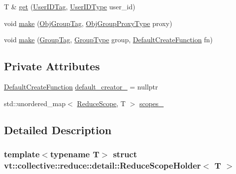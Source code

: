 \begin{DoxyCompactItemize}
\item 
T \& \hyperlink{structvt_1_1collective_1_1reduce_1_1detail_1_1_reduce_scope_holder_a2413b5fd1fbd0b87b09d81240000e5f8}{get} (\hyperlink{structvt_1_1collective_1_1reduce_1_1detail_1_1_reduce_scope_holder_1_1_user_i_d_tag}{User\+I\+D\+Tag}, \hyperlink{namespacevt_1_1collective_1_1reduce_1_1detail_ae82d7b96b0885b9b7dfb0104398beead}{User\+I\+D\+Type} user\+\_\+id)
\item 
void \hyperlink{structvt_1_1collective_1_1reduce_1_1detail_1_1_reduce_scope_holder_a0226c973a9bc67754fe5ce3076cb077e}{make} (\hyperlink{structvt_1_1collective_1_1reduce_1_1detail_1_1_reduce_scope_holder_1_1_obj_group_tag}{Obj\+Group\+Tag}, \hyperlink{namespacevt_ad7cae989df485fccca57f0792a880a8e}{Obj\+Group\+Proxy\+Type} proxy)
\item 
void \hyperlink{structvt_1_1collective_1_1reduce_1_1detail_1_1_reduce_scope_holder_a47ef025fc658370a2d42680f7c006abb}{make} (\hyperlink{structvt_1_1collective_1_1reduce_1_1detail_1_1_reduce_scope_holder_1_1_group_tag}{Group\+Tag}, \hyperlink{namespacevt_a27b5e4411c9b6140c49100e050e2f743}{Group\+Type} group, \hyperlink{structvt_1_1collective_1_1reduce_1_1detail_1_1_reduce_scope_holder_ac1bca1874a023b11bdc3c26b165c3b20}{Default\+Create\+Function} fn)
\end{DoxyCompactItemize}
\subsection*{Private Attributes}
\begin{DoxyCompactItemize}
\item 
\hyperlink{structvt_1_1collective_1_1reduce_1_1detail_1_1_reduce_scope_holder_ac1bca1874a023b11bdc3c26b165c3b20}{Default\+Create\+Function} \hyperlink{structvt_1_1collective_1_1reduce_1_1detail_1_1_reduce_scope_holder_abd3a6a6a1eda5083b97348c16ef58858}{default\+\_\+creator\+\_\+} = nullptr
\item 
std\+::unordered\+\_\+map$<$ \hyperlink{structvt_1_1collective_1_1reduce_1_1detail_1_1_reduce_scope}{Reduce\+Scope}, T $>$ \hyperlink{structvt_1_1collective_1_1reduce_1_1detail_1_1_reduce_scope_holder_a71e4ba9dc78528dd93e253f4ff24e0e4}{scopes\+\_\+}
\end{DoxyCompactItemize}


\subsection{Detailed Description}
\subsubsection*{template$<$typename T$>$\newline
struct vt\+::collective\+::reduce\+::detail\+::\+Reduce\+Scope\+Holder$<$ T $>$}

